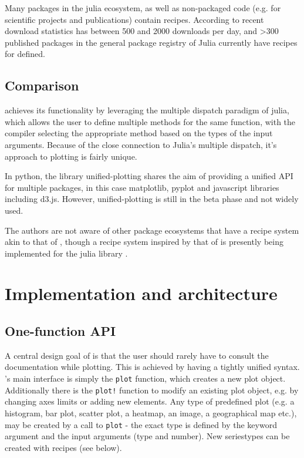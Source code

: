 \documentclass[a4paper]{article}
\begin{document}
Many packages in the julia ecosystem, as well as non-packaged code (e.g. for scientific projects and publications) contain \Plots recipes.
According to recent download statistics\cite{PackageDownloadStats} \Plots has between 500 and 2000 downloads per day, and >300 published packages in the general package registry of Julia currently have recipes for \Plots defined.

\subsection*{Comparison}
\Plots achieves its functionality by leveraging the multiple dispatch paradigm of julia, which allows the user to define multiple methods for the same function, with the compiler selecting the appropriate method based on the types of the input arguments.
Because of the close connection to Julia's multiple dispatch, it's approach to plotting is fairly unique.

In python, the library unified-plotting\cite{UnifiedPlottingUnifiedplotting} shares the aim of providing a unified API for multiple packages, in this case matplotlib\cite{Hunter:2007}, pyplot and javascript libraries including d3.js\cite{bostockD3JsDataDriven}.
However, unified-plotting is still in the beta phase and not widely used.

The authors are not aware of other package ecosystems that have a recipe system akin to that of \Plots{}, though a recipe system inspired by that of \Plots{} is presently being implemented for the julia library \cite{danischMakieJlFlexible2021}.

\section*{Implementation and architecture}


\subsection*{One-function API\footnotemark}

A central design goal of \Plots is that the user should rarely have to consult the documentation while plotting.
This is achieved by having a tightly unified syntax.
\Plots's main interface is simply the \texttt{plot} function, which creates a new plot object.
Additionally there is the \texttt{plot!} function to modify an existing plot object, e.g. by changing axes limits or adding new elements.
Any type of predefined plot (e.g. a histogram, bar plot, scatter plot, a heatmap, an image, a geographical map etc.), may be created by a call to \texttt{plot} - the exact type is defined by the keyword argument  and the input arguments (type and number).
New seriestypes can be created with recipes (see below).
\end{document}
